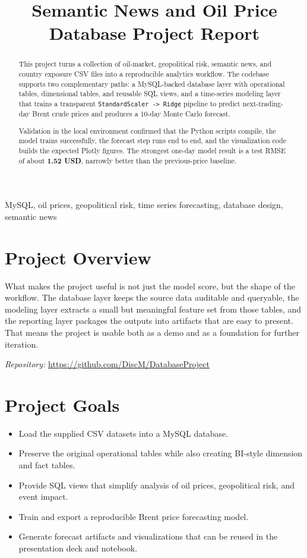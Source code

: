 \documentclass[conference]{IEEEtran}
\title{Semantic News and Oil Price Database Project Report}
\author{\IEEEauthorblockN{Steven Anthony Salabao, Eliza Hall, and Xinghan Chen}}
\begin{document}
\maketitle

\begin{abstract}
This project turns a collection of oil-market, geopolitical risk, semantic news, and country exposure CSV files into a reproducible analytics workflow. The codebase supports two complementary paths: a MySQL-backed database layer with operational tables, dimensional tables, and reusable SQL views, and a time-series modeling layer that trains a transparent \texttt{StandardScaler -> Ridge} pipeline to predict next-trading-day Brent crude prices and produces a 10-day Monte Carlo forecast.

Validation in the local environment confirmed that the Python scripts compile, the model trains successfully, the forecast step runs end to end, and the visualization code builds the expected Plotly figures. The strongest one-day model result is a test RMSE of about \textbf{1.52 USD}, narrowly better than the previous-price baseline.
\end{abstract}

\begin{IEEEkeywords}
MySQL, oil prices, geopolitical risk, time series forecasting, database design, semantic news
\end{IEEEkeywords}

\section{Project Overview}

What makes the project useful is not just the model score, but the shape of the workflow. The database layer keeps the source data auditable and queryable, the modeling layer extracts a small but meaningful feature set from those tables, and the reporting layer packages the outputs into artifacts that are easy to present. That means the project is usable both as a demo and as a foundation for further iteration.

\vspace{0.25em}
\noindent\textit{Repository:} \url{https://github.com/DiscM/DatabaseProject}

\section{Project Goals}

\begin{itemize}
  \item Load the supplied CSV datasets into a MySQL database.
  \item Preserve the original operational tables while also creating BI-style dimension and fact tables.
  \item Provide SQL views that simplify analysis of oil prices, geopolitical risk, and event impact.
  \item Train and export a reproducible Brent price forecasting model.
  \item Generate forecast artifacts and visualizations that can be reused in the presentation deck and notebook.
\end{itemize}
\end{document}

